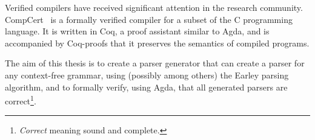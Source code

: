 

	Verified compilers have received significant attention in the research
	community. CompCert~\cite{Leroy} is a formally verified compiler for a
	subset of the C programming language. It is written in Coq, a proof
	assistant similar to Agda, and is accompanied by Coq-proofs that it
	preserves the semantics of compiled programs. 

	The aim of this thesis is to create a parser generator that can create a
	parser for any context-free grammar, using (possibly among others) the
	Earley parsing algorithm, and to formally verify, using Agda, that all
	generated parsers are correct\footnote{\emph{Correct} meaning sound and
	complete.}.

